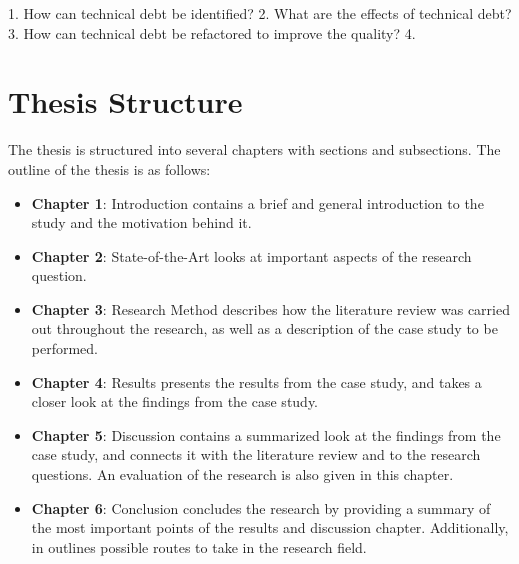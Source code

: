 1. How can technical debt be identified?
2. What are the effects of technical debt?
3. How can technical debt be refactored to improve the quality?
4. 


\section{Thesis Structure}
The thesis is structured into several chapters with sections and subsections. The outline of the thesis is as follows:
\begin{itemize}
	\item{\textbf{Chapter 1}}: Introduction contains a brief and general introduction to the study and the motivation behind it.
	\item{\textbf{Chapter 2}}: State-of-the-Art looks at important aspects of the research question.
	\item{\textbf{Chapter 3}}: Research Method describes how the literature review was carried out throughout the research, as well as a description of the case study to be performed.
	\item{\textbf{Chapter 4}}: Results presents the results from the case study, and takes a closer look at the findings from the case study.
	\item{\textbf{Chapter 5}}: Discussion contains a summarized look at the findings from the case study, and connects it with the literature review and to the research questions. An evaluation of the research is also given in this chapter.
	\item{\textbf{Chapter 6}}: Conclusion concludes the research by providing a summary of the most important points of the results and discussion chapter. Additionally, in outlines possible routes to take in the research field.
\end{itemize}

